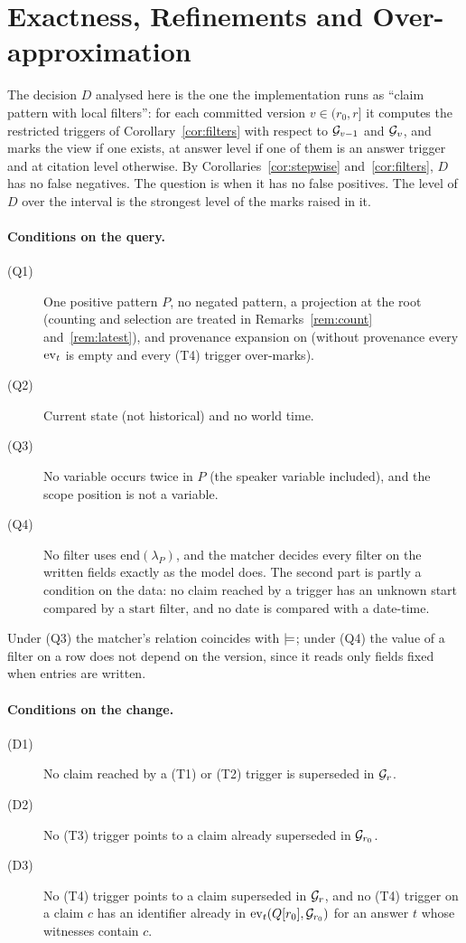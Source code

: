 \section{Exactness, Refinements and Over-approximation}\label{sec:s-exactness}

The decision $D$ analysed here is the one the implementation runs as ``claim pattern with local
filters'': for each committed version $v\in(r_0,r]$ it computes the restricted triggers of
Corollary~\ref{cor:filters} with respect to $\mathcal G_{v-1}$ and $\mathcal G_v$, and marks the view if one
exists, at answer level if one of them is an answer trigger and at citation level otherwise. By
Corollaries~\ref{cor:stepwise} and~\ref{cor:filters}, $D$ has no false negatives. The question is
when it has no false positives. The level of $D$ over the interval is the strongest level of
the marks raised in it.

\paragraph{Conditions on the query.}
\begin{description}
\item[(Q1)] One positive pattern $P$, no negated pattern, a projection at the root (counting
  and selection are treated in Remarks~\ref{rem:count} and~\ref{rem:latest}), and provenance
  expansion on (without provenance every $\mathrm{ev}_t$ is empty and every (T4) trigger over-marks).
\item[(Q2)] Current state (not historical) and no world time.
\item[(Q3)] No variable occurs twice in $P$ (the speaker variable included), and the scope
  position is not a variable.
\item[(Q4)] No filter uses $\mathrm{end}(\lambda_P)$, and the matcher decides every filter on the
  written fields exactly as the model does. The second part is partly a condition on the data:
  no claim reached by a trigger has an unknown start compared by a $\mathrm{start}$ filter, and
  no date is compared with a date-time.
\end{description}
Under (Q3) the matcher's relation coincides with $\models$; under (Q4) the value of a filter on a
row does not depend on the version, since it reads only fields fixed when entries are written.

\paragraph{Conditions on the change.}
\begin{description}
\item[(D1)] No claim reached by a (T1) or (T2) trigger is superseded in $\mathcal G_r$.
\item[(D2)] No (T3) trigger points to a claim already superseded in $\mathcal G_{r_0}$.
\item[(D3)] No (T4) trigger points to a claim superseded in $\mathcal G_r$, and no (T4) trigger on a claim
  $c$ has an identifier already in $\mathrm{ev}_t(Q[r_0],\mathcal G_{r_0})$ for an answer $t$ whose witnesses
  contain $c$.
\end{description}

